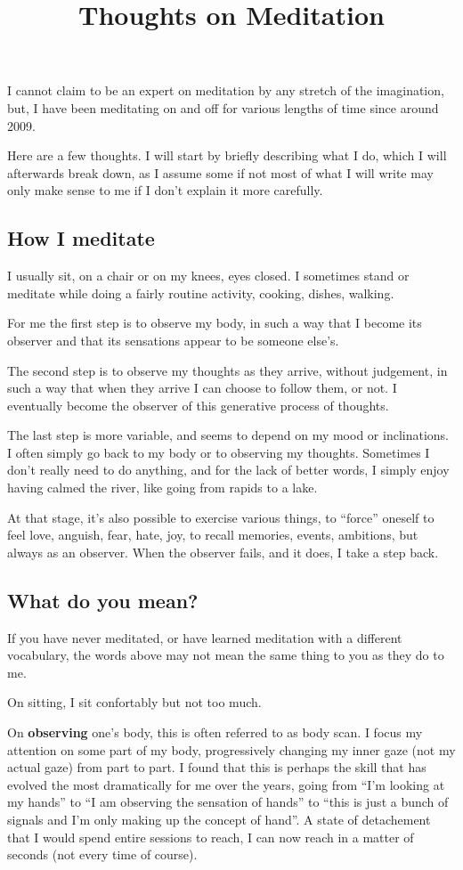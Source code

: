 \title{Thoughts on Meditation}

I cannot claim to be an expert on meditation by any stretch of the imagination, but, I have been meditating on and off for various lengths of time since around 2009.

Here are a few thoughts. I will start by briefly describing what I do, which I will afterwards break down, as I assume some if not most of what I will write may only make sense to me if I don't explain it more carefully.


\subsection{How I meditate}

I usually sit, on a chair or on my knees, eyes closed. I sometimes stand or meditate while doing a fairly routine activity, cooking, dishes, walking.

For me the first step is to observe my body, in such a way that I become its observer and that its sensations appear to be someone else's.

The second step is to observe my thoughts as they arrive, without judgement, in such a way that when they arrive I can choose to follow them, or not. I eventually become the observer of this generative process of thoughts.

The last step is more variable, and seems to depend on my mood or inclinations. I often simply go back to my body or to observing my thoughts. Sometimes I don't really need to do anything, and for the lack of better words, I simply enjoy having calmed the river, like going from rapids to a lake.

At that stage, it's also possible to exercise various things, to ``force'' oneself to feel love, anguish, fear, hate, joy, to recall memories, events, ambitions, but always as an observer. When the observer fails, and it does, I take a step back.

\subsection{What do you mean?}

If you have never meditated, or have learned meditation with a different vocabulary, the words above may not mean the same thing to you as they do to me.

On sitting, I sit confortably but not too much.

On \textbf{observing} one's body, this is often referred to as body scan. I focus my attention on some part of my body, progressively changing my inner gaze (not my actual gaze) from part to part. I found that this is perhaps the skill that has evolved the most dramatically for me over the years, going from ``I'm looking at my hands'' to ``I am observing the sensation of hands'' to ``this is just a bunch of signals and I'm only making up the concept of hand''. A state of detachement that I would spend entire sessions to reach, I can now reach in a matter of seconds (not every time of course).

